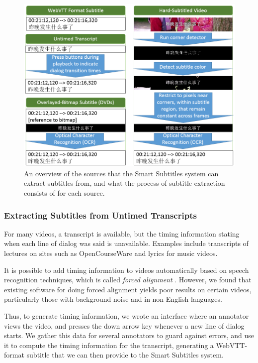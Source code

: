 \documentclass{sigchi}
\begin{document}
\begin{figure}[!h]
\centering
\includegraphics[width=\columnwidth]{subtitle-sources}
\caption{An overview of the sources that the Smart Subtitles system can extract subtitles from, and what the process of subtitle extraction consists of for each source.}
\label{fig:figure3}
\end{figure}

\subsubsection{Extracting Subtitles from Untimed Transcripts}

For many videos, a transcript is available, but the timing information
stating when each line of dialog was said is unavailable.
Examples include transcripts of lectures on sites such as
OpenCourseWare and lyrics for music videos.

It is possible to add timing information to videos automatically based on speech recognition techniques, which is called \emph{forced alignment} \cite{sailalign}.
However, we found that existing software for doing forced alignment
yields poor results on certain videos, particularly those with background
noise and in non-English languages.

Thus, to generate timing information,
we wrote an interface where an annotator
views the video, and presses the down arrow key whenever a new
line of dialog starts.
We gather this data for several annotators to guard against errors,
and use it to compute the timing information for the transcript,
generating a WebVTT-format subtitle that we can then provide to the Smart Subtitles system.
\end{document}
